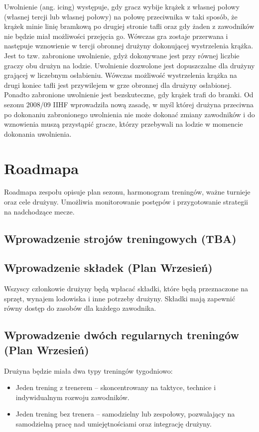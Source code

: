 \documentclass{article}
\begin{document}
Uwolnienie (ang. icing) występuje, gdy gracz wybije krążek z własnej połowy (własnej tercji lub własnej połowy) na połowę przeciwnika w taki sposób, że krążek minie linię bramkową po drugiej stronie tafli oraz gdy żaden z zawodników nie będzie miał możliwości przejęcia go. Wówczas gra zostaje przerwana i następuje wznowienie w tercji obronnej drużyny dokonującej wystrzelenia krążka. Jest to tzw. zabronione uwolnienie, gdyż dokonywane jest przy równej liczbie graczy obu drużyn na lodzie. Uwolnienie dozwolone jest dopuszczalne dla drużyny grającej w liczebnym osłabieniu. Wówczas możliwość wystrzelenia krążka na drugi koniec tafli jest przywilejem w grze obronnej dla drużyny osłabionej. Ponadto zabronione uwolnienie jest bezskuteczne, gdy krążek trafi do bramki. Od sezonu 2008/09 IIHF wprowadziła nową zasadę, w myśl której drużyna przeciwna po dokonaniu zabronionego uwolnienia nie może dokonać zmiany zawodników i do wznowienia muszą przystąpić gracze, którzy przebywali na lodzie w momencie dokonania uwolnienia.


\section{Roadmapa}

Roadmapa zespołu opisuje plan sezonu, harmonogram treningów, ważne turnieje oraz cele drużyny. Umożliwia monitorowanie postępów i przygotowanie strategii na nadchodzące mecze.


\subsection{Wprowadzenie strojów treningowych (TBA)}

\subsection{Wprowadzenie składek (Plan Wrzesień)}

Wszyscy członkowie drużyny będą wpłacać składki, które będą przeznaczone na sprzęt, wynajem lodowiska i inne potrzeby drużyny. Składki mają zapewnić równy dostęp do zasobów dla każdego zawodnika.

\subsection{Wprowadzenie dwóch regularnych treningów (Plan Wrzesień)}

Drużyna będzie miała dwa typy treningów tygodniowo:
\begin{itemize}
    \item Jeden trening z trenerem – skoncentrowany na taktyce, technice i indywidualnym rozwoju zawodników.
    \item Jeden trening bez trenera – samodzielny lub zespołowy, pozwalający na samodzielną pracę nad umiejętnościami oraz integrację drużyny.
\end{itemize}
\end{document}
